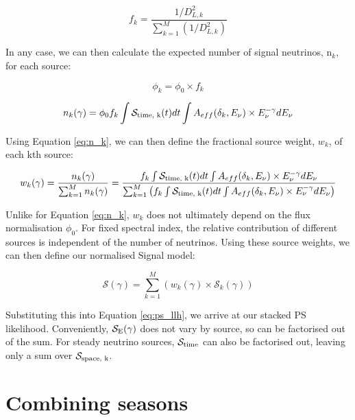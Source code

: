 \begin{equation}
 f_{k} = \frac{1/D_{L,k}^{2}}{\sum^{M}_{k=1}(1/D_{L,k}^{2})}
 \end{equation}

In any case, we can then calculate the expected number of signal neutrinos, n$_{k}$, for each source:

\begin{equation}
\phi_{k} = \phi_{0} \times f_{k}
\end{equation}

\begin{equation}
n_{k} (\gamma) = \phi_{0} f_{k} \int \mathcal{S}_{\textup{time, k}}(t) dt \int A_{eff}(\delta_{k}, E_{\nu}) \times E_{\nu}^{-\gamma} dE_{\nu}
\label{eq:n_k}
\end{equation}

Using Equation \ref{eq:n_k}, we can then define the fractional source weight, $w_{k}$, of each kth source:

\begin{equation}
w_{k}(\gamma)  = \frac{n_{k}(\gamma) }{\sum^{M}_{k=1} n_{k}(\gamma) } = \frac{f_{k} \int \mathcal{S}_{\textup{time, k}}(t) dt \int A_{eff}(\delta_{k}, E_{\nu}) \times E_{\nu}^{-\gamma} dE_{\nu}}{\sum^{M}_{k=1} \left( f_{k} \int \mathcal{S}_{\textup{time, k}}(t) dt \int A_{eff}(\delta_{k}, E_{\nu}) \times E_{\nu}^{-\gamma} dE_{\nu} \right)}
\end{equation}

Unlike for Equation \ref{eq:n_k}, $w_{k}$ does not ultimately depend on the flux normalisation $\phi_{0}$. For fixed spectral index, the relative contribution of different sources is independent of the number of neutrinos. Using these source weights, we can then define our normalised Signal model:

\begin{equation}
\mathcal{S}(\gamma) = \sum^{M}_{k=1} \left( w_{k}(\gamma)  \times \mathcal{S}_{k}(\gamma)  \right)
\label{eq:S_stacked}
\end{equation}

Substituting this into Equation \ref{eq:ps_llh}, we arrive at our stacked PS likelihood. Conveniently, $\mathcal{S}_{\textup{E}}(\gamma)$ does not vary by source, so can be factorised out of the sum. For steady neutrino sources, $\mathcal{S}_{\textup{time}}$ can also be factorised out, leaving only a sum over $\mathcal{S}_{\textup{space, k}}$.

\section{Combining seasons}

